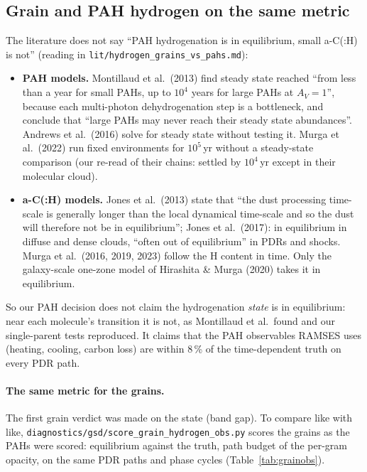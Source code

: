 \documentclass[11pt,a4paper]{article}
\begin{document}
\subsection{Grain and PAH hydrogen on the same metric}\label{sec:hwhy}
The literature does not say ``PAH hydrogenation is in equilibrium, small a-C(:H) is not'' (reading in
\texttt{lit/hydrogen\_grains\_vs\_pahs.md}):
\begin{itemize}
\item \textbf{PAH models.} Montillaud et al.\ (2013) find steady state reached ``from less than a year for small PAHs,
  up to $10^4$ years for large PAHs at $A_V = 1$'', because each multi-photon dehydrogenation step is a bottleneck, and
  conclude that ``large PAHs may never reach their steady state abundances''. Andrews et al.\ (2016) solve for steady
  state without testing it. Murga et al.\ (2022) run fixed environments for $10^5$\,yr without a steady-state
  comparison (our re-read of their chains: settled by $10^4$\,yr except in their molecular cloud).
\item \textbf{a-C(:H) models.} Jones et al.\ (2013) state that ``the dust processing time-scale is generally longer
  than the local dynamical time-scale and so the dust will therefore not be in equilibrium''; Jones et al.\ (2017):
  in equilibrium in diffuse and dense clouds, ``often out of equilibrium'' in PDRs and shocks. Murga et al.\ (2016,
  2019, 2023) follow the H content in time. Only the galaxy-scale one-zone model of Hirashita \& Murga (2020) takes it
  in equilibrium.
\end{itemize}
So our PAH decision does not claim the hydrogenation \emph{state} is in equilibrium: near each molecule's transition
it is not, as Montillaud et al.\ found and our single-parent tests reproduced. It claims that the PAH observables
RAMSES uses (heating, cooling, carbon loss) are within 8\,\% of the time-dependent truth on every PDR path.

\paragraph{The same metric for the grains.} The first grain verdict was made on the state (band gap). To compare like with
like, \texttt{diagnostics/gsd/score\_grain\_hydrogen\_obs.py} scores the grains as the PAHs were scored: equilibrium
against the truth, path budget of the per-gram opacity, on the same PDR paths and phase cycles
(Table~\ref{tab:grainobs}).
\end{document}
